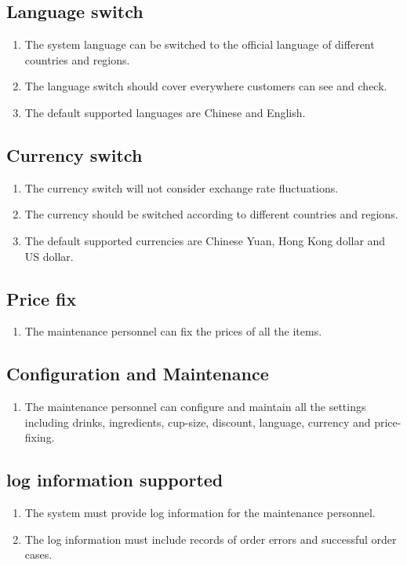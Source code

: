 \documentclass[a4paper]{report}
\begin{document}
\subsection{Language switch}
\begin{enumerate}
\item The system language can be switched to the official language of different countries and regions.
\item The language switch should cover everywhere customers can see and check.
\item The default supported languages are Chinese and English.
\end{enumerate}

\subsection{Currency switch}
\begin{enumerate}
\item The currency switch will not consider exchange rate fluctuations.
\item The currency should be switched according to different countries and regions.
\item The default supported currencies are Chinese Yuan, Hong Kong dollar and US dollar.
\end{enumerate}

\subsection{Price fix}
\begin{enumerate}
\item The maintenance personnel can fix the prices of all the items.
\end{enumerate}

\subsection{Configuration and Maintenance}
\begin{enumerate}
\item The maintenance personnel can configure and maintain all the settings including drinks, ingredients, cup-size, discount, language, currency and price-fixing.
\end{enumerate}

\subsection{log information supported}
\begin{enumerate}
\item The system must provide log information for the maintenance personnel.
\item The log information must include records of order errors and successful order cases.
\end{enumerate}
\end{document}
